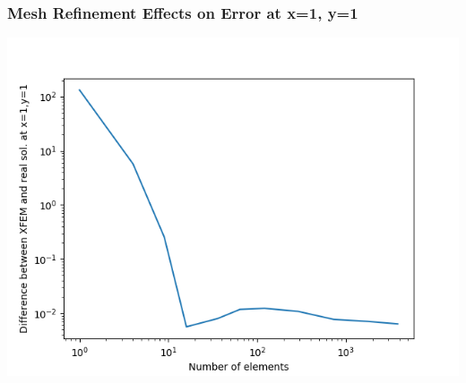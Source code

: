 \documentclass[]{beamer}
\begin{document}
\begin{frame}[t]\frametitle{Mesh Refinement Effects on Error at x=1, y=1}
	\begin{center}
		\includegraphics[scale=0.5]{figures/2D_rz_ls1m/2D_rz_ls1mat_neumann_comp}
	\end{center}
\end{frame}
\end{document}
